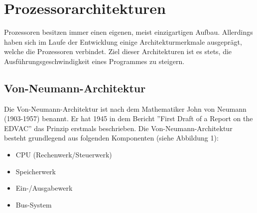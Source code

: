 \documentclass[a4paper,12pt]{article}
\begin{document}
\section{Prozessorarchitekturen}
Prozessoren besitzen immer einen eigenen, meist einzigartigen Aufbau. Allerdings haben sich im Laufe der Entwicklung einige Architekturmerkmale ausgeprägt, welche die Prozessoren verbindet. 
Ziel dieser Architekturen ist es stets, die Ausführungsgeschwindigkeit eines Programmes zu steigern.
\subsection{Von-Neumann-Architektur}
Die Von-Neumann-Architektur ist nach dem Mathematiker John von Neumann (1903-1957) benannt. Er hat 1945 in dem Bericht ''First Draft of a Report on the EDVAC'' das Prinzip erstmals beschrieben.
Die Von-Neumann-Architektur besteht grundlegend aus folgenden Komponenten \cite{von1993first} (siehe Abbildung 1):
\begin{samepage}
\begin{itemize}
\item CPU (Rechenwerk/Steuerwerk)
\item Speicherwerk 
\item Ein-/Ausgabewerk
\item Bus-System
\end{itemize}
\end{samepage}
\end{document}
